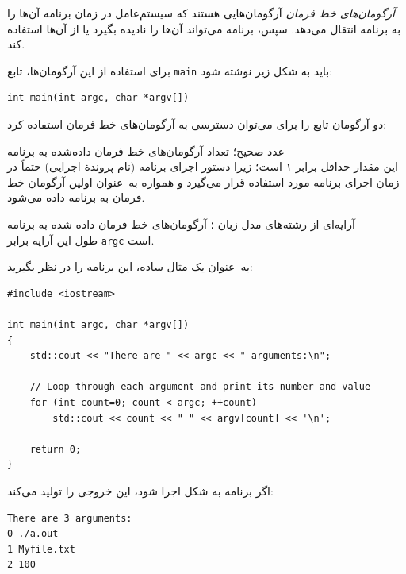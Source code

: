 \documentclass{utap}
\renewcommand{\labelitemi}{$\circ$}
\begin{document}
    \textit{آرگومان‌های خط فرمان} آرگومان‌هایی هستند که سیستم‌عامل در زمان برنامه آن‌ها را به برنامه انتقال می‌دهد. سپس، برنامه می‌تواند آن‌ها را نادیده بگیرد یا از آن‌ها استفاده کند.

    برای استفاده از این آرگومان‌ها، تابع \lstinline{main} باید به شکل زیر نوشته شود:
    \begin{latin}\begin{lstlisting}
int main(int argc, char *argv[])
    \end{lstlisting}\end{latin}

    دو آرگومان تابع  را برای می‌توان دسترسی به آرگومان‌های خط فرمان استفاده کرد:
    \begin{description}[leftmargin=5em,style=nextline,font=\labelitemi\quad\bfseries]
        \item[\lr{\texttt{argc}}] عدد صحیح؛ تعداد آرگومان‌های خط فرمان داده‌شده به برنامه\\
        این مقدار حداقل برابر ۱ است؛ زیرا دستور اجرای برنامه (نام پروندهٔ اجرایی) حتماً در زمان اجرای برنامه مورد استفاده قرار می‌گیرد و همواره به~عنوان اولین آرگومان خط فرمان به برنامه داده می‌شود.
        \item[\lr{\texttt{argv}}] آرایه‌ای از رشته‌های مدل زبان ؛ آرگومان‌های خط فرمان داده شده به برنامه\\
        طول این آرایه برابر \lstinline{argc} است.
    \end{description}

    به~عنوان یک مثال ساده، این برنامه را در نظر بگیرید:
    \begin{latin}\begin{lstlisting}
#include <iostream>
 
int main(int argc, char *argv[])
{
    std::cout << "There are " << argc << " arguments:\n";
 
    // Loop through each argument and print its number and value
    for (int count=0; count < argc; ++count)
        std::cout << count << " " << argv[count] << '\n';
 
    return 0;
}

    \end{lstlisting}\end{latin}

    اگر برنامه به شکل  اجرا شود، این خروجی را تولید می‌کند:
    \begin{latin}%
    \begin{Verbatim}[fontsize=\small]
There are 3 arguments:
0 ./a.out
1 Myfile.txt
2 100
    \end{Verbatim}
    \end{latin}
\end{document}
